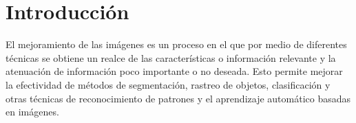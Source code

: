
\chapter{Introducción}
\label{chp:intro}

%
%
%
%
%

El mejoramiento de las im\'agenes es un proceso en el que por medio de diferentes t\'ecnicas se obtiene un realce de las caracter\'isticas o informaci\'on relevante y la atenuaci\'on de informaci\'on poco importante o no deseada. Esto permite mejorar la efectividad de m\'etodos de segmentaci\'on, rastreo de objetos, clasificaci\'on y otras t\'ecnicas de reconocimiento de patrones y el aprendizaje autom\'atico basadas en im\'agenes. 


